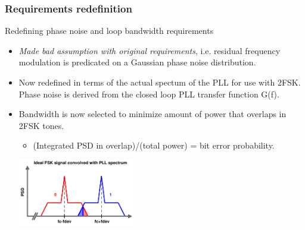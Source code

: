 \documentclass[t, screen, aspectratio=43]{beamer}
\begin{document}
\begin{frame}
	\frametitle{Requirements redefinition}
	\begin{block}{Redefining phase noise and loop bandwidth requirements}
		\begin{itemize}
			\scriptsize
			\item \textit{Made bad assumption with original requirements}, i.e. residual frequency modulation is predicated on a Gaussian phase noise distribution.
			\item Now redefined in terms of the actual spectum of the PLL for use with 2FSK. Phase noise is derived from the closed loop PLL transfer function G(f).
			\item Bandwidth is now selected to minimize amount of power that overlaps in 2FSK tones.
			\begin{itemize}
				\scriptsize
				\item (Integrated PSD in overlap)/(total power) = bit error probability.
			\end{itemize}
			\vspace{-0.5em}
			\center\includegraphics[width=0.4\textwidth, angle=0]{fsk_tones_rx2.pdf}
			\vspace{-0.5em}
		\end{itemize} 	
	\end{block}
\end{frame}
\end{document}
